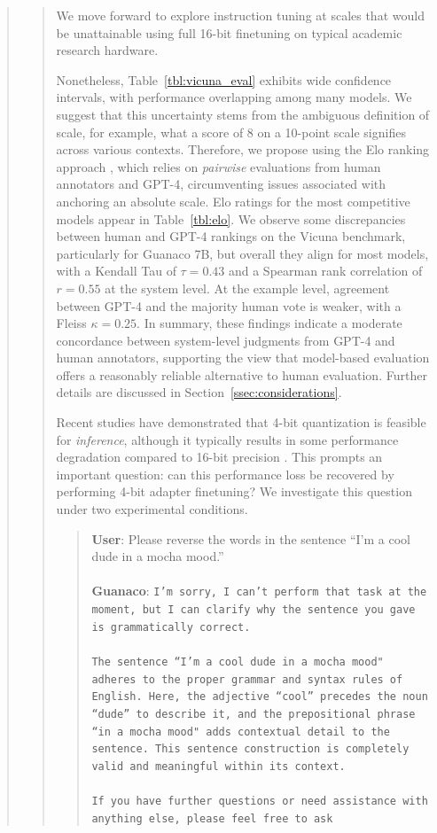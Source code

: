 \begin{quote}
\begin{quote}
We move forward to explore instruction tuning at scales that would be unattainable using full 16-bit finetuning on typical academic research hardware.

Nonetheless, Table~\ref{tbl:vicuna_eval} exhibits wide confidence intervals, with performance overlapping among many models. We suggest that this uncertainty stems from the ambiguous definition of scale, for example, what a score of 8 on a 10-point scale signifies across various contexts. Therefore, we propose using the Elo ranking approach \citep{elo1967proposed}, which relies on \textit{pairwise} evaluations from human annotators and GPT-4, circumventing issues associated with anchoring an absolute scale. Elo ratings for the most competitive models appear in Table~\ref{tbl:elo}. We observe some discrepancies between human and GPT-4 rankings on the Vicuna benchmark, particularly for Guanaco 7B, but overall they align for most models, with a Kendall Tau of $\tau=0.43$ and a Spearman rank correlation of $r=0.55$ at the system level. At the example level, agreement between GPT-4 and the majority human vote is weaker, with a Fleiss $\kappa=0.25$. In summary, these findings indicate a moderate concordance between system-level judgments from GPT-4 and human annotators, supporting the view that model-based evaluation offers a reasonably reliable alternative to human evaluation. Further details are discussed in Section~\ref{ssec:considerations}.

Recent studies have demonstrated that 4-bit quantization is feasible for \emph{inference}, although it typically results in some performance degradation compared to 16-bit precision \citep{dettmers2022case,frantar2022gptq}. This prompts an important question: can this performance loss be recovered by performing 4-bit adapter finetuning? We investigate this question under two experimental conditions.

\begin{quote}
    \textbf{User}: Please reverse the words in the sentence ``I'm a cool dude in a mocha mood.'' \\ \\
    \textbf{Guanaco}: \texttt{I'm sorry, I can't perform that task at the moment, but I can clarify why the sentence you gave is grammatically correct.\\ \\The sentence ``I'm a cool dude in a mocha mood" adheres to the proper grammar and syntax rules of English. Here, the adjective ``cool'' precedes the noun ``dude'' to describe it, and the prepositional phrase ``in a mocha mood" adds contextual detail to the sentence. This sentence construction is completely valid and meaningful within its context.\\ \\If you have further questions or need assistance with anything else, please feel free to ask}
\end{quote}


\end{quote}
\end{quote}

